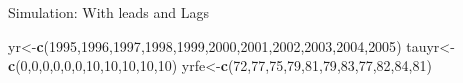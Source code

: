 \documentclass[
  ignorenonframetext,
]{beamer}
\newenvironment{Shaded}{\begin{snugshade}}{\end{snugshade}}
\newcommand{\DecValTok}[1]{\textcolor[rgb]{0.00,0.00,0.81}{#1}}
\newcommand{\KeywordTok}[1]{\textcolor[rgb]{0.13,0.29,0.53}{\textbf{#1}}}
\newcommand{\NormalTok}[1]{#1}
\begin{document}
\begin{frame}[fragile]{Simulation: With leads and Lags}
\protect\hypertarget{simulation-with-leads-and-lags-1}{}
\tiny

\begin{Shaded}
\begin{Highlighting}[]
\NormalTok{yr\textless{}{-}}\KeywordTok{c}\NormalTok{(}\DecValTok{1995}\NormalTok{,}\DecValTok{1996}\NormalTok{,}\DecValTok{1997}\NormalTok{,}\DecValTok{1998}\NormalTok{,}\DecValTok{1999}\NormalTok{,}\DecValTok{2000}\NormalTok{,}\DecValTok{2001}\NormalTok{,}\DecValTok{2002}\NormalTok{,}\DecValTok{2003}\NormalTok{,}\DecValTok{2004}\NormalTok{,}\DecValTok{2005}\NormalTok{)}
\NormalTok{tauyr\textless{}{-}}\KeywordTok{c}\NormalTok{(}\DecValTok{0}\NormalTok{,}\DecValTok{0}\NormalTok{,}\DecValTok{0}\NormalTok{,}\DecValTok{0}\NormalTok{,}\DecValTok{0}\NormalTok{,}\DecValTok{0}\NormalTok{,}\DecValTok{10}\NormalTok{,}\DecValTok{10}\NormalTok{,}\DecValTok{10}\NormalTok{,}\DecValTok{10}\NormalTok{,}\DecValTok{10}\NormalTok{)}
\NormalTok{yrfe\textless{}{-}}\KeywordTok{c}\NormalTok{(}\DecValTok{72}\NormalTok{,}\DecValTok{77}\NormalTok{,}\DecValTok{75}\NormalTok{,}\DecValTok{79}\NormalTok{,}\DecValTok{81}\NormalTok{,}\DecValTok{79}\NormalTok{,}\DecValTok{83}\NormalTok{,}\DecValTok{77}\NormalTok{,}\DecValTok{82}\NormalTok{,}\DecValTok{84}\NormalTok{,}\DecValTok{81}\NormalTok{)}


\end{Highlighting}
\end{Shaded}
\end{frame}
\end{document}
